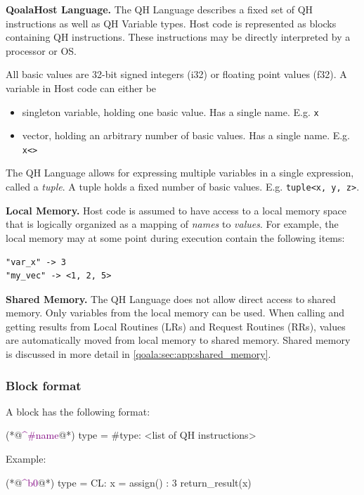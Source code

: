 \textbf{QoalaHost Language.}
The QH Language describes a fixed set of QH instructions as well as QH Variable types.
Host code is represented as blocks containing QH instructions.
These instructions may be directly interpreted by a processor or OS.

All basic values are 32-bit signed integers (i32) or floating point values (f32).
A variable in Host code can either be
\begin{itemize}
\item singleton variable, holding one basic value. Has a single name. E.g. \texttt{x}
\item vector, holding an arbitrary number of basic values. Has a single name. E.g. \texttt{x<>}
\end{itemize}

The QH Language allows for expressing multiple variables in a single expression, called a \textit{tuple}.
A tuple holds a fixed number of basic values. E.g. \texttt{tuple<x, y, z>}.

\textbf{Local Memory.}
Host code is assumed to have access to a local memory space that is logically organized as a mapping of \textit{names} to \textit{values}.
For example, the local memory may at some point during execution contain the following items:

\begin{lstlisting}
"var_x" -> 3
"my_vec" -> <1, 2, 5>
\end{lstlisting}


\textbf{Shared Memory.}
The QH Language does not allow direct access to shared memory.
Only variables from the local memory can be used.
When calling and getting results from Local Routines (LRs) and Request Routines (RRs), values are automatically
moved from local memory to shared memory. 
Shared memory is discussed in more detail in \cref{qoala:sec:app:shared_memory}.

\subsubsection{Block format}

A block has the following format:
\begin{qoalacode}
(*@\textcolor{purple}{\textasciicircum \#name}@*) {type = #type}:
    <list of QH instructions>
\end{qoalacode}

Example:
\begin{qoalacode}
(*@\textcolor{purple}{\textasciicircum b0}@*) {type = CL}:
    x = assign() : 3
    return_result(x)
\end{qoalacode}


